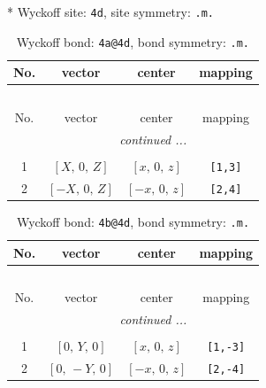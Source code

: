 \documentclass[fleqn,8pt]{jsarticle}
\begin{document}
* Wyckoff site: {\tt 4d}, site symmetry: {\tt .m.}
\renewcommand{\arraystretch}{1.2}
\begin{longtable}{cccc}
\caption{Wyckoff bond: {\tt 4a@4d}, bond symmetry: {\tt .m.}}
 \\
 \hline \hline
No. & vector & center & mapping \\ \hline \endfirsthead

\multicolumn{3}{l}{\tablename\ \thetable{}} \\
 \hline \hline
No. & vector & center & mapping \\ \hline \endhead

 \hline \hline
\multicolumn{3}{r}{\footnotesize\it continued ...} \\ \endfoot

 \hline \hline
\multicolumn{3}{r}{} \\ \endlastfoot

1 & $\left[ X,\, 0,\, Z \right]$ & $\left[ x,\, 0,\, z \right]$ & {\tt [1,3]} \\ \hline
2 & $\left[ - X,\, 0,\, Z \right]$ & $\left[ - x,\, 0,\, z \right]$ & {\tt [2,4]} \\
\end{longtable}
\renewcommand{\arraystretch}{1.2}
\begin{longtable}{cccc}
\caption{Wyckoff bond: {\tt 4b@4d}, bond symmetry: {\tt .m.}}
 \\
 \hline \hline
No. & vector & center & mapping \\ \hline \endfirsthead

\multicolumn{3}{l}{\tablename\ \thetable{}} \\
 \hline \hline
No. & vector & center & mapping \\ \hline \endhead

 \hline \hline
\multicolumn{3}{r}{\footnotesize\it continued ...} \\ \endfoot

 \hline \hline
\multicolumn{3}{r}{} \\ \endlastfoot

1 & $\left[ 0,\, Y,\, 0 \right]$ & $\left[ x,\, 0,\, z \right]$ & {\tt [1,-3]} \\ \hline
2 & $\left[ 0,\, - Y,\, 0 \right]$ & $\left[ - x,\, 0,\, z \right]$ & {\tt [2,-4]} \\
\end{longtable}
\renewcommand{\arraystretch}{1.2}
\end{document}
